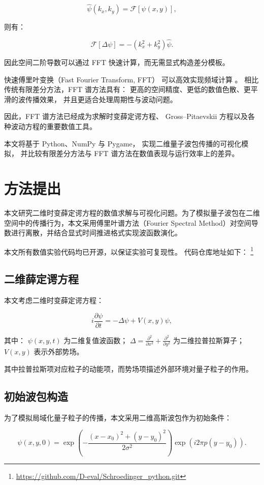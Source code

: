 \documentclass[UTF8,a4paper,12pt]{ctexart}
\begin{document}
\[
\hat\psi(k_x,k_y)
=
\mathcal{F}[\psi(x,y)],
\]

则有：

\[
\mathcal{F}[\Delta\psi]
=
-(k_x^2+k_y^2)\hat\psi.
\]

因此空间二阶导数可以通过 FFT 快速计算，而无需显式构造差分模板。

快速傅里叶变换（Fast Fourier Transform, FFT）
可以高效实现频域计算 \cite{fft}。
相比传统有限差分方法，FFT 谱方法具有：
更高的空间精度、更低的数值色散、更平滑的波传播效果，
并且更适合处理周期性与波动问题。

因此，FFT 谱方法已经成为求解时变薛定谔方程、
Gross--Pitaevskii 方程以及各种波动方程的重要数值工具。

本文将基于 Python、NumPy 与 Pygame，
实现二维量子波包传播的可视化模拟，
并比较有限差分方法与 FFT 谱方法在数值表现与运行效率上的差异。

\section{方法提出}

本文研究二维时变薛定谔方程的数值求解与可视化问题。为了模拟量子波包在二维空间中的传播行为，本文采用傅里叶谱方法（Fourier Spectral Method）对空间导数进行离散，并结合显式时间推进格式实现波函数演化。

本文所有数值实验代码均已开源，以保证实验可复现性。
代码仓库地址如下：
\footnote{\url{https://github.com/D-eval/Schroedinger_python.git}}

\subsection{二维薛定谔方程}

本文考虑二维时变薛定谔方程：

\[
i\frac{\partial \psi}{\partial t}
=
-\Delta \psi + V(x,y)\psi,
\]

其中：
$\psi(x,y,t)$ 为二维复值波函数；
$\Delta=\frac{\partial^2}{\partial x^2}+\frac{\partial^2}{\partial y^2}$ 为二维拉普拉斯算子；
$V(x,y)$ 表示外部势场。

其中拉普拉斯项对应粒子的动能项，而势场项描述外部环境对量子粒子的作用。

\subsection{初始波包构造}

为了模拟局域化量子粒子的传播，本文采用二维高斯波包作为初始条件：

\[
\psi(x,y,0)
=
\exp\left(
-\frac{(x-x_0)^2+(y-y_0)^2}{2\sigma^2}
\right)
\exp\left(
i2\pi p(y-y_0)
\right).
\]
\end{document}
